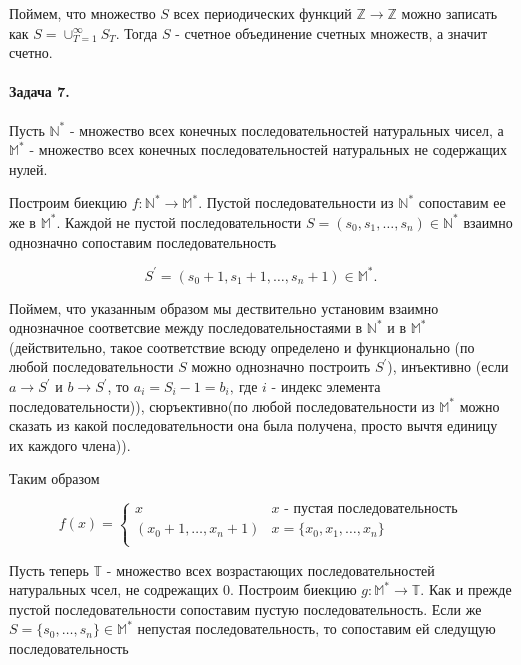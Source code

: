 \documentclass{article}
\newcommand{\pr}{^{\prime}}
\newcommand{\N}{\mathbb{N}}
\newcommand{\M}{\mathbb{M}}
\newcommand{\T}{\mathbb{T}}
\begin{document}
    Поймем, что множество $S$ всех периодических функций $\mathbb{Z} \rightarrow \mathbb{Z}$ можно записать как $S = \cup_{T = 1}^{\infty} S_T$. Тогда $S$ - счетное объединение счетных множеств, а значит счетно.

    \paragraph{Задача 7.}
    Пусть $\N^*$ - множество всех конечных последовательностей натуральных чисел, 
    а     $\M^*$ - множество всех конечных последовательностей натуральных не содержащих нулей. 
    
    Построим биекцию $f: \N^* \rightarrow \M^*$.
    Пустой последовательности из $\N^*$ сопоставим ее же в $\M^*$.
    Каждой не пустой последовательности $S = (s_0, s_1, \ldots, s_n) \in \N^*$ взаимно однозначно сопоставим последовательность

    $$S\pr = (s_0 + 1, s_1 + 1, \ldots, s_n + 1) \in \M^*.$$

    Поймем, что указанным образом мы дествительно установим взаимно однозначное соответсвие между последовательностаями в $\N^*$ и в $\M^*$ 
    (действительно, такое соответствие 
    всюду определено и функционально
    (по любой последовательности $S$ можно однозначно построить $S\pr$), 
    инъективно 
    (если $a \rightarrow S\pr$ и $b \rightarrow S\pr$, то $a_i = S_i - 1 = b_i,\ $где $i$ - индекс элемента последовательности)),
    сюръективно(по любой последовательности из $\M^*$ можно сказать из какой последовательности она была получена, просто вычтя единицу их каждого члена)).

    Таким образом

    \begin{equation*}
        f(x) = 
         \begin{cases}
           x &\text{$x$ - пустая последовательность}\\
           (x_0 + 1, \ldots, x_n + 1) &\text{$x = \{x_0, x_1, \ldots, x_n\}$}\\
         \end{cases}
    \end{equation*}


    Пусть теперь $\T$ - множество всех возрастающих последовательностей натуральных чсел, не содрежащих 0.
    Построим биекцию $g: \M^* \rightarrow \T$. Как и прежде пустой последовательности сопоставим пустую последовательность.
    Если же $S = \{s_0, \ldots, s_n\} \in \M^*$ непустая последовательность, то сопоставим ей следущую последовательность 
\end{document}
